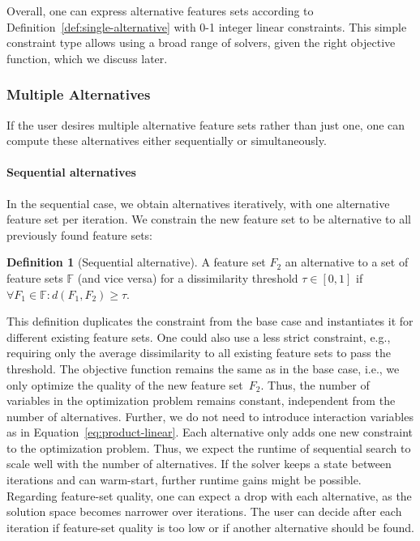 \documentclass[conference]{IEEEtran}
\theoremstyle{definition}
\newtheorem{definition}{Definition}
\begin{document}
Overall, one can express alternative features sets according to Definition~\ref{def:single-alternative} with 0-1 integer linear constraints.
This simple constraint type allows using a broad range of solvers, given the right objective function, which we discuss later.

\subsubsection{Multiple Alternatives}
\label{sec:approach:constraints:multiple}

If the user desires multiple alternative feature sets rather than just one, one can compute these alternatives either sequentially or simultaneously.

\paragraph{Sequential alternatives}

In the sequential case, we obtain alternatives iteratively, with one alternative feature set per iteration.
We constrain the new feature set to be alternative to all previously found feature sets:
%
\begin{definition}[Sequential alternative]
	A feature set $F_2$ an alternative to a set of feature sets $\mathbb{F}$ (and vice versa) for a dissimilarity threshold $\tau \in [0,1]$ if $\forall F_1 \in \mathbb{F}: d(F_1,F_2) \geq \tau$.
	\label{def:sequential-alternative}
\end{definition}
%
This definition duplicates the constraint from the base case and instantiates it for different existing feature sets.
One could also use a less strict constraint, e.g., requiring only the average dissimilarity to all existing feature sets to pass the threshold.
The objective function remains the same as in the base case, i.e., we only optimize the quality of the new feature set~$F_2$.
Thus, the number of variables in the optimization problem remains constant, independent from the number of alternatives.
Further, we do not need to introduce interaction variables as in Equation~\ref{eq:product-linear}.
Each alternative only adds one new constraint to the optimization problem.
Thus, we expect the runtime of sequential search to scale well with the number of alternatives.
If the solver keeps a state between iterations and can warm-start, further runtime gains might be possible.
Regarding feature-set quality, one can expect a drop with each alternative, as the solution space becomes narrower over iterations.
The user can decide after each iteration if feature-set quality is too low or if another alternative should be found.
\end{document}
